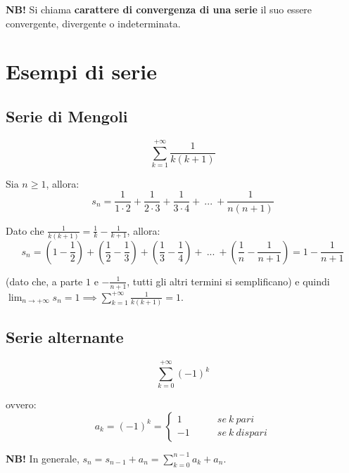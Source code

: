 \documentclass{article}
\begin{document}
\noindent\textbf{NB!} Si chiama \textbf{carattere di convergenza di una serie} il suo essere convergente, divergente o indeterminata.

\section{Esempi di serie}
\subsection{Serie di Mengoli}
\begin{equation*}
    \sum_{k = 1}^{+\infty} \frac{1}{k(k + 1)}
\end{equation*}

\noindent Sia $n \geq 1$, allora:
\begin{equation*}
    s_n = \frac{1}{1 \cdot 2} + \frac{1}{2 \cdot 3} + \frac{1}{3 \cdot 4} + \ ... \ + \frac{1}{n(n + 1)}
\end{equation*}

\noindent Dato che $\frac{1}{k(k + 1)} = \frac{1}{k} - \frac{1}{k + 1}$, allora:
\begin{equation*}
    s_n = \left(1 - \frac{1}{2}\right) + \left(\frac{1}{2} - \frac{1}{3}\right) + \left(\frac{1}{3} - \frac{1}{4}\right) + \ ... \ + \left(\frac{1}{n} - \frac{1}{n + 1}\right) = 1 - \frac{1}{n + 1}
\end{equation*}

\noindent (dato che, a parte $1$ e $-\frac{1}{n + 1}$, tutti gli altri termini si semplificano) e quindi $\lim_{n \to +\infty} s_n = 1 \implies \sum_{k = 1}^{+\infty} \frac{1}{k(k + 1)} = 1$.

\subsection{Serie alternante}
\begin{equation*}
    \sum_{k = 0}^{+\infty} (-1)^k
\end{equation*}

\noindent ovvero:
\begin{equation*}
    a_k = (-1)^k = \begin{cases}
        1 \qquad & se \ k \ pari \\
        -1 \qquad & se \ k \ dispari
    \end{cases} 
\end{equation*}

\noindent\textbf{NB!} In generale, $s_n = s_{n - 1} + a_n = \sum_{k = 0}^{n - 1} a_k + a_n$.\\
\end{document}
